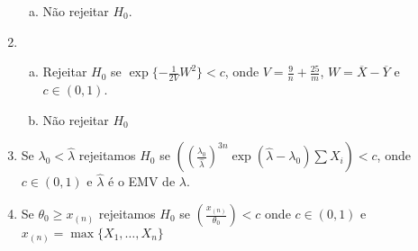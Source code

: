 \documentclass[10pt,brazil,addpoints]{exam}
\begin{document}
\begin{enumerate}[1.]
\begin{enumerate}[a)]
\item Não rejeitar $H_0$.
\end{enumerate}

\item  
\begin{enumerate}[a)]
\item Rejeitar $H_0$ se $\exp\{-\frac{1}{2V}W^2\}< c$, onde $V=\frac{9}{n}+\frac{25}{m}$, $W=\overline{X}-\overline{Y}$ e $c\in (0,1)$.

\item Não rejeitar $H_0$
\end{enumerate}


\item Se $\lambda_0 < \hat{\lambda}$ rejeitamos $H_0$ se $\left(\left(\frac{\lambda_0}{\hat{\lambda}}\right)^{3n}\exp{(\hat{\lambda}-\lambda_0)\sum X_i}\right)< c$, onde $c \in (0,1)$ e $\hat{\lambda}$ é o EMV de $\lambda$.

\item Se $\theta_0 \geq x_{(n)}$ rejeitamos $H_0$ se $\left(\frac{x_{(n)}}{\theta_0}\right) < c$ onde $c \in (0,1)$ e $x_{(n)}=\max\{X_1, \ldots, X_n\}$


\end{enumerate}
\end{document}
